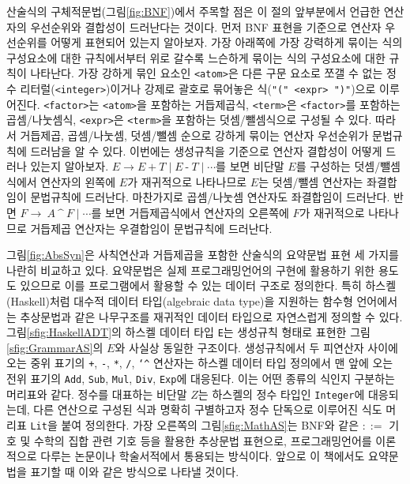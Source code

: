 산술식의 구체적문법(그림\;\ref{fig:BNF})에서 주목할 점은 이 절의
앞부분에서 언급한 연산자의 우선순위와 결합성이 드러난다는 것이다.
먼저 BNF 표현을 기준으로 연산자 우선순위를 어떻게 표현되어 있는지 알아보자.
가장 아래쪽에 가장 강력하게 묶이는 식의 구성요소에 대한 규칙에서부터
위로 갈수록 느슨하게 묶이는 식의 구성요소에 대한 규칙이 나타난다.
가장 강하게 묶인 요소인 \texttt{<atom>}은
다른 구문 요소로 쪼갤 수 없는 정수 리터럴(\texttt{<integer>})이거나
강제로 괄호로 묶어놓은 식(\texttt{"(" <expr> ")"})으로 이루어진다.
\texttt{<factor>}는 \texttt{<atom>}을 포함하는 거듭제곱식,
\texttt{<term>}은 \texttt{<factor>}를 포함하는 곱셈/나눗셈식,
\texttt{<expr>}은 \texttt{<term>}을 포함하는 덧셈/뺄셈식으로
구성될 수 있다. 따라서 거듭제곱, 곱셈/나눗셈, 덧셈/뺄셈 순으로
강하게 묶이는 연산자 우선순위가 문법규칙에 드러남을 알 수 있다.
이번에는 생성규칙을 기준으로 연산자 결합성이 어떻게 드러나 있는지 알아보자.
$E \to E ~\texttt{+}~ T \mid  E ~\texttt{-}~ T \mid \cdots$를 보면
비단말 $E$를 구성하는 덧셈/뺄셈식에서 연산자의 왼쪽에 $E$가 재귀적으로
나타나므로 $E$는 덧셈/뺄셈 연산자는 좌결합임이 문법규칙에 드러난다.
마찬가지로 곱셈/나눗셈 연산자도 좌결합임이 드러난다.
반면 $F \to~ A ~\texttt{\char`^}~ F \mid \cdots$를 보면 거듭제곱식에서
연산자의 오른쪽에 $F$가 재귀적으로 나타나므로 거듭제곱 연산자는
우결합임이 문법규칙에 드러난다.

그림\;\ref{fig:AbsSyn}은 사칙연산과 거듭제곱을 포함한 산술식의
요약문법 표현 세 가지를 나란히 비교하고 있다. 요약문법은 실제
프로그래밍언어의 구현에 활용하기 위한 용도도 있으므로 이를
프로그램에서 활용할 수 있는 데이터 구조로 정의한다. 특히
하스켈(Haskell)처럼 대수적 데이터 타입(algebraic data type)을
지원하는 함수형 언어에서는 추상문법과 같은 나무구조를 재귀적인
데이터 타입으로 자연스럽게 정의할 수 있다.
그림\;\ref{sfig:HaskellADT}의 하스켈 데이터 타입 \texttt{E}는
생성규칙 형태로 표현한 그림\;\ref{sfig:GrammarAS}의 $E$와
사실상 동일한 구조이다. 생성규칙에서 두 피연산자 사이에 오는
중위 표기의 \texttt{+}, \texttt{-}, \texttt{*}, \texttt{/},
\texttt{\char`^} 연산자는 하스켈 데이터 타입 정의에서
맨 앞에 오는 전위 표기의 \texttt{Add}, \texttt{Sub}, \texttt{Mul},
\texttt{Div}, \texttt{Exp}에 대응된다. 이는 어떤 종류의 식인지
구분하는 머리표와 같다. 정수를 대표하는 비단말 $Z$는 하스켈의
정수 타입인 \texttt{Integer}에 대응되는데, 다른 연산으로 구성된 식과
명확히 구별하고자 정수 단독으로 이루어진 식도 머리표 \texttt{Lit}을
붙여 정의한다. 가장 오른쪽의 그림\;\ref{sfig:MathAS}는 BNF와 같은
$::=$ 기호 및 수학의 집합 관련 기호 등을 활용한 추상문법 표현으로,
프로그래밍언어를 이론적으로 다루는 논문\cite{Milner78,tal-toplas99}이나
학술서적\cite{Winskel93,Mitchell96fpl}에서 통용되는 방식이다. 앞으로
이 책에서도 요약문법을 표기할 때 이와 같은 방식으로 나타낼 것이다.

